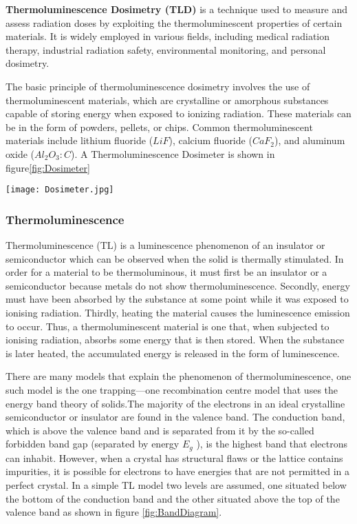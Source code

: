 \documentclass[../../Report.tex]{subfiles}
\begin{document}
    \textbf{Thermoluminescence Dosimetry (TLD)} is a technique used to measure and assess radiation doses by exploiting 
    the thermoluminescent properties of certain materials. It is widely employed in various fields, including medical 
    radiation therapy, industrial radiation safety, environmental monitoring, and personal dosimetry.

    The basic principle of thermoluminescence dosimetry involves the use of thermoluminescent materials, which are 
    crystalline or amorphous substances capable of storing energy when exposed to ionizing radiation. These materials 
    can be in the form of powders, pellets, or chips. Common thermoluminescent materials include lithium fluoride ($LiF$), 
    calcium fluoride ($CaF_2$), and aluminum oxide ($Al_2O_3:C$). A Thermoluminescence Dosimeter is shown in figure\ref{fig:Dosimeter}

    \begin{Figure}
        \centering
        \texttt{[image: Dosimeter.jpg]}
        \label{fig:Dosimeter}
    \end{Figure}

    \subsubsection*{\large Thermoluminescence}
        Thermoluminescence (TL) is a luminescence phenomenon\cite{a6} of an insulator or semiconductor which can be observed when
        the solid is thermally stimulated. In order for a material to be thermoluminous, it must first be an insulator 
        or a semiconductor because metals do not show thermoluminescence. Secondly, energy must have been absorbed by 
        the substance at some point while it was exposed to ionising radiation. Thirdly, heating the material causes the 
        luminescence emission to occur. Thus, a thermoluminescent material is one that, when subjected to ionising 
        radiation, absorbs some energy that is then stored. When the substance is later heated, the accumulated energy is 
        released in the form of luminescence.\cite{b1}
        
        There are many models that explain the phenomenon of thermoluminescence\cite{b5}, one such model is the one 
        trapping—one recombination centre model\cite{b2} that uses the energy band theory of solids.The majority of the 
        electrons in an ideal crystalline semiconductor or insulator are found in the valence band. The conduction band, 
        which is above the valence band and is separated from it by the so-called forbidden band gap (separated by energy $E_g$ ), 
        is the highest band that electrons can inhabit. However, when a crystal has structural flaws or the lattice 
        contains impurities, it is possible for electrons to have energies that are not permitted in a perfect crystal.
        In a simple TL model two levels are assumed, one situated below the bottom of the conduction band and the other 
        situated above the top of the valence band as shown in figure \ref{fig:BandDiagram}. 
\end{document}
